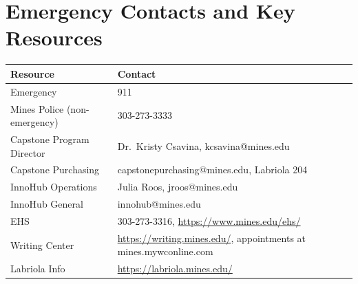 \section{Emergency Contacts and Key Resources}

\begin{center}\small
\begin{tabularx}{\textwidth}{lX}
\toprule
\textbf{Resource} & \textbf{Contact} \\
\midrule
Emergency & 911 \\
Mines Police (non-emergency) & 303-273-3333 \\
Capstone Program Director & Dr.\ Kristy Csavina, kcsavina@mines.edu \\
Capstone Purchasing & capstonepurchasing@mines.edu, Labriola 204 \\
InnoHub Operations & Julia Roos, jroos@mines.edu \\
InnoHub General & innohub@mines.edu \\
EHS & 303-273-3316, \url{https://www.mines.edu/ehs/} \\
Writing Center & \url{https://writing.mines.edu/}, appointments at mines.mywconline.com \\
Labriola Info & \url{https://labriola.mines.edu/} \\
\bottomrule
\end{tabularx}
\end{center}

